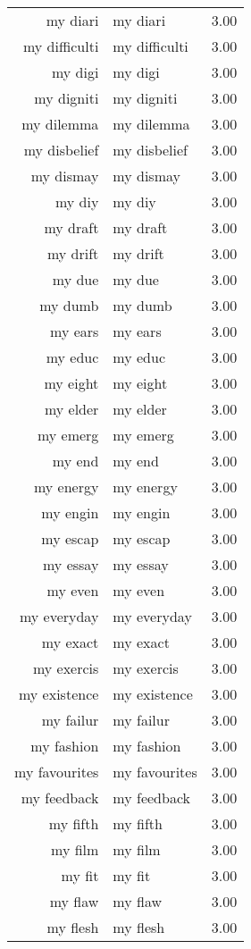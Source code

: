 \begin{table}[ht]
\begin{tabular}{rlr}
  my diari & my diari & 3.00 \\ 
  my difficulti & my difficulti & 3.00 \\ 
  my digi & my digi & 3.00 \\ 
  my digniti & my digniti & 3.00 \\ 
  my dilemma & my dilemma & 3.00 \\ 
  my disbelief & my disbelief & 3.00 \\ 
  my dismay & my dismay & 3.00 \\ 
  my diy & my diy & 3.00 \\ 
  my draft & my draft & 3.00 \\ 
  my drift & my drift & 3.00 \\ 
  my due & my due & 3.00 \\ 
  my dumb & my dumb & 3.00 \\ 
  my ears & my ears & 3.00 \\ 
  my educ & my educ & 3.00 \\ 
  my eight & my eight & 3.00 \\ 
  my elder & my elder & 3.00 \\ 
  my emerg & my emerg & 3.00 \\ 
  my end & my end & 3.00 \\ 
  my energy & my energy & 3.00 \\ 
  my engin & my engin & 3.00 \\ 
  my escap & my escap & 3.00 \\ 
  my essay & my essay & 3.00 \\ 
  my even & my even & 3.00 \\ 
  my everyday & my everyday & 3.00 \\ 
  my exact & my exact & 3.00 \\ 
  my exercis & my exercis & 3.00 \\ 
  my existence & my existence & 3.00 \\ 
  my failur & my failur & 3.00 \\ 
  my fashion & my fashion & 3.00 \\ 
  my favourites & my favourites & 3.00 \\ 
  my feedback & my feedback & 3.00 \\ 
  my fifth & my fifth & 3.00 \\ 
  my film & my film & 3.00 \\ 
  my fit & my fit & 3.00 \\ 
  my flaw & my flaw & 3.00 \\ 
  my flesh & my flesh & 3.00 \\ 

\end{tabular}
\end{table}
